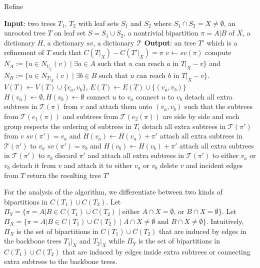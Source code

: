 \documentclass{bmcart}
\begin{document}
\begin{algorithm}
    \caption{Refine}
    \label{alg:refine}
    \begin{algorithmic}[1]
        \Statex \textbf{Input}: two trees $T_1$, $T_2$ with leaf sets $S_1$ and $S_2$ where $S_1 \cap S_2 = X \neq \emptyset$, an unrooted tree $T$ on leaf set $S = S_1 \cup S_2$, a nontrivial bipartition $\pi = A|B$ of $X$, a dictionary $H$, a dictionary $sv$, a dictionary $\mathcal{T}$
        \Statex \textbf{Output}: an tree $T'$ which is a refinement of $T$ such that $C(T|_X) - C(T'|_X) = \pi$ 
        \State $v \gets sv(\pi)$
        \State compute $N_A:= \{u \in N_{t|_x}(v) \mid \text{$\exists a \in A$ such that $u$ can reach $a$ in $T|_X-v$}\}$ and $N_B:= \{u \in N_{T|_X}(v) \mid \text{$\exists b \in B$ such that $u$ can reach $b$ in $T|_X-v$}\}$.
        \State $V(T) \gets V(T) \cup \{v_a, v_b\}$, $E(T) \gets E(T) \cup \{(v_a,v_b)\}$
        \State $H(v_a) \gets \emptyset, H(v_b) \gets \emptyset$
             connect $u$ to $v_a$
            \Else{} connect $u$ to $v_b$
            \EndIf
        \EndFor
        \State detach all extra subtrees in $\mathcal{T}(\pi)$ from $v$ and attach them onto $(v_a,v_b)$ such that the subtrees from $\mathcal{T}(e_1(\pi))$ and subtrees from $\mathcal{T}(e_2(\pi))$ are side by side and each group respects the ordering of subtrees in $T_i$
            \State detach all extra subtrees in $\mathcal{T}(\pi')$ from $v$ 
                \State $sv(\pi') = v_a$ and $H(v_a) \gets H(v_a) + \pi'$
                \State attach all extra subtrees in $\mathcal{T}(\pi')$ to $v_a$
                \State $sv(\pi') = v_b$ and $H(v_b) \gets H(v_b) + \pi'$
                \State attach all extra subtrees in $\mathcal{T}(\pi')$ to $v_b$
            \Else{} 
                \State discard $\pi'$ and attach all extra subtrees in $\mathcal{T}(\pi')$ to either $v_a$ or $v_b$ 
            \EndIf
        \EndFor
            \State detach it from $v$ and attach it to either $v_a$ or $v_b$
        \EndFor
        \State delete $v$ and incident edges from $T$
        \State return the resulting tree $T'$
    \end{algorithmic}
\end{algorithm}

For the analysis of the algorithm, we differentiate between two kinds of bipartitions in $C(T_1) \cup C(T_2)$. Let $\Pi_Y = \{\pi = A|B \in C(T_1) \cup C(T_2) \mid \text{either } A\cap X = \emptyset \text{, or } B \cap X = \emptyset\}$. Let $\Pi_X = \{\pi = A|B \in C(T_1) \cup C(T_2) \mid A\cap X \neq \emptyset \text{ and } B\cap X \neq \emptyset \}$. Intuitively, $\Pi_X$ is the set of bipartitions in $C(T_1)\cup C(T_2)$ that are induced by edges in the backbone trees $T_1|_X$ and $T_2|_X$ while $\Pi_Y$ is the set of bipartitions in $C(T_1)\cup C(T_2)$ that are induced by edges inside extra subtrees or connecting extra subtrees to the backbone trees.\\
\end{document}
